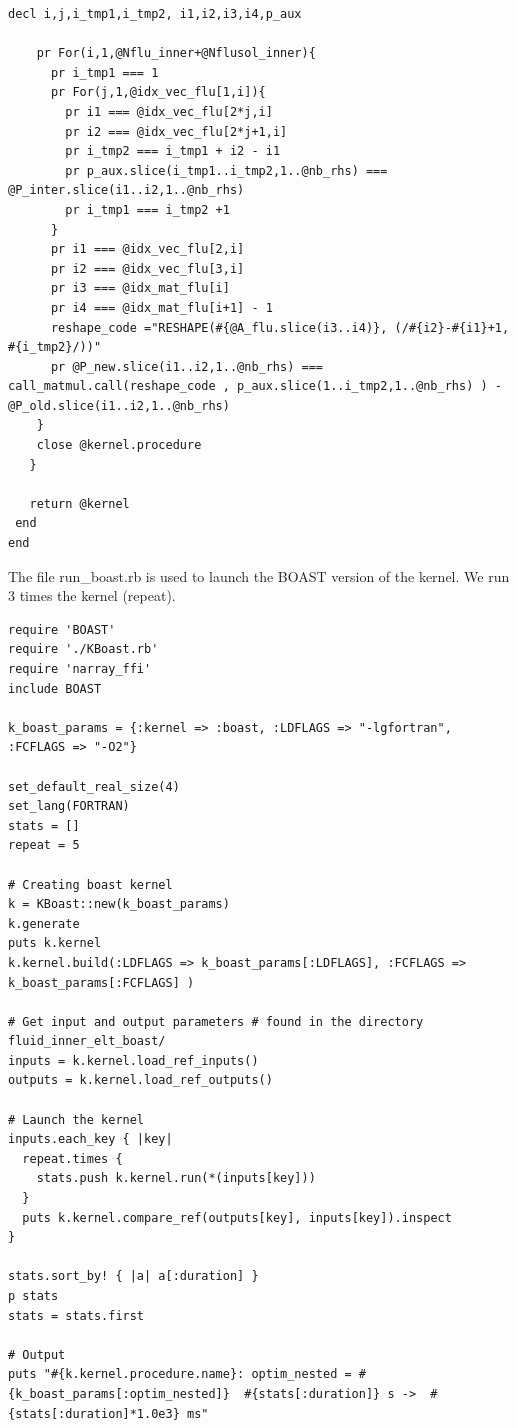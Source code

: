 \documentclass[10pt,twoside]{article}   	%
\begin{document}
\begin{lstlisting}[caption=KBoast.rb]
    decl i,j,i_tmp1,i_tmp2, i1,i2,i3,i4,p_aux

    pr For(i,1,@Nflu_inner+@Nflusol_inner){
      pr i_tmp1 === 1
      pr For(j,1,@idx_vec_flu[1,i]){
        pr i1 === @idx_vec_flu[2*j,i]
        pr i2 === @idx_vec_flu[2*j+1,i]
        pr i_tmp2 === i_tmp1 + i2 - i1
        pr p_aux.slice(i_tmp1..i_tmp2,1..@nb_rhs) === @P_inter.slice(i1..i2,1..@nb_rhs) 
        pr i_tmp1 === i_tmp2 +1
      }
      pr i1 === @idx_vec_flu[2,i]
      pr i2 === @idx_vec_flu[3,i]
      pr i3 === @idx_mat_flu[i]
      pr i4 === @idx_mat_flu[i+1] - 1
      reshape_code ="RESHAPE(#{@A_flu.slice(i3..i4)}, (/#{i2}-#{i1}+1, #{i_tmp2}/))"
      pr @P_new.slice(i1..i2,1..@nb_rhs) === call_matmul.call(reshape_code , p_aux.slice(1..i_tmp2,1..@nb_rhs) ) - @P_old.slice(i1..i2,1..@nb_rhs)
    }
    close @kernel.procedure
   }

   return @kernel
 end
end
\end{lstlisting}


\noindent The file run\_boast.rb is used to launch the BOAST version of the kernel. We run 3 times the kernel (repeat). \\

\begin{lstlisting}[caption=run\_boast.rb]
require 'BOAST'
require './KBoast.rb'
require 'narray_ffi'
include BOAST

k_boast_params = {:kernel => :boast, :LDFLAGS => "-lgfortran", :FCFLAGS => "-O2"}  

set_default_real_size(4)
set_lang(FORTRAN)
stats = []
repeat = 5

# Creating boast kernel
k = KBoast::new(k_boast_params)
k.generate
puts k.kernel
k.kernel.build(:LDFLAGS => k_boast_params[:LDFLAGS], :FCFLAGS => k_boast_params[:FCFLAGS] )
 
# Get input and output parameters # found in the directory fluid_inner_elt_boast/
inputs = k.kernel.load_ref_inputs()
outputs = k.kernel.load_ref_outputs()

# Launch the kernel
inputs.each_key { |key|
  repeat.times {
    stats.push k.kernel.run(*(inputs[key]))
  }
  puts k.kernel.compare_ref(outputs[key], inputs[key]).inspect
}

stats.sort_by! { |a| a[:duration] }
p stats
stats = stats.first

# Output
puts "#{k.kernel.procedure.name}: optim_nested = #{k_boast_params[:optim_nested]}  #{stats[:duration]} s ->  #{stats[:duration]*1.0e3} ms"
\end{lstlisting}
\end{document}
